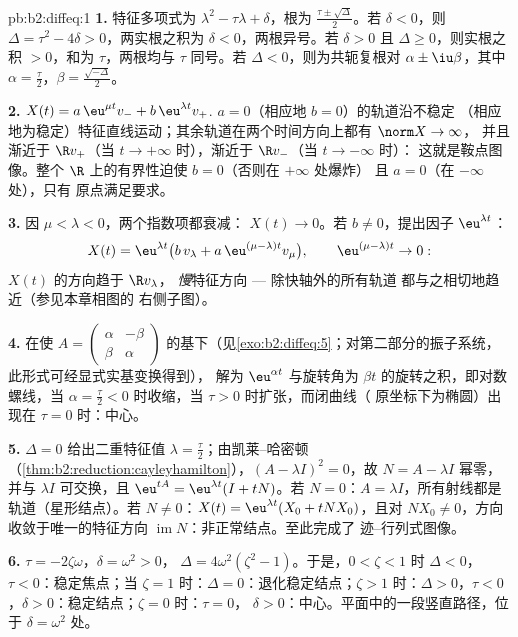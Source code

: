 \begin{solution}{pb:b2:diffeq:1}
\textbf{1.} 特征多项式为 $\lambda^2 -
\tau\lambda + \delta$，根为
$\frac{\tau\pm\sqrt\Delta}{2}$。若 $\delta < 0$，则 $\Delta =
\tau^2 - 4\delta > 0$，两实根之积为
$\delta < 0$，两根异号。若 $\delta > 0$ 且 $\Delta \geq
0$，则实根之积 $> 0$，和为 $\tau$，两根均与
$\tau$ 同号。若 $\Delta < 0$，则为共轭复根对 $\alpha \pm
\iu\beta$，其中 $\alpha = \frac\tau2$，$\beta =
\frac{\sqrt{-\Delta}}2$。

\textbf{2.} $X(t) = a\,\eu^{\mu t}v_- + b\,\eu^{\lambda t}v_+$.
$a = 0$（相应地 $b = 0$）的轨道沿不稳定
（相应地为稳定）特征直线运动；其余轨道在两个时间方向上都有 $\norm X \to \infty$，
并且渐近于 $\R v_+$（当 $t \to
+\infty$ 时），渐近于 $\R v_-$（当 $t \to -\infty$ 时）：
这就是鞍点图像。整个 $\R$ 上的有界性迫使 $b = 0$（否则在 $+\infty$ 处爆炸）
且 $a = 0$（在 $-\infty$ 处），只有
原点满足要求。

\textbf{3.} 因 $\mu < \lambda < 0$，两个指数项都衰减：
$X(t) \to 0$。若 $b \neq 0$，提出因子 $\eu^{\lambda t}$：
\[
X(t) = \eu^{\lambda t}\bigl(b\,v_\lambda + a\,\eu^{(\mu -
\lambda)t}v_\mu\bigr),
\qquad \eu^{(\mu-\lambda)t} \to 0 :
\]
$X(t)$ 的方向趋于 $\R v_\lambda$，
\emph{慢}特征方向 --- 除快轴外的所有轨道
都与之相切地趋近（参见本章相图的
右侧子图）。

\textbf{4.} 在使 $A = \begin{pmatrix} \alpha &
-\beta\\ \beta & \alpha\end{pmatrix}$
的基下（见\cref{exo:b2:diffeq:5}；对第二部分的振子系统，
此形式可经显式实基变换得到），
解为 $\eu^{\alpha t}$ 与旋转角为 $\beta
t$ 的旋转之积，即对数螺线，当 $\alpha = \frac\tau2
< 0$ 时收缩，当 $\tau > 0$ 时扩张，而闭曲线（
原坐标下为椭圆）出现在 $\tau = 0$ 时：中心。

\textbf{5.} $\Delta = 0$ 给出二重特征值 $\lambda =
\frac\tau2$；由凯莱–哈密顿
（\cref{thm:b2:reduction:cayleyhamilton}），$(A - \lambda I)^2 =
0$，故 $N = A - \lambda I$ 幂零，并与
$\lambda I$ 可交换，且 $\eu^{tA} = \eu^{\lambda t}(I + tN)$。若 $N =
0$：$A = \lambda I$，所有射线都是轨道（星形结点）。若 $N
\neq 0$：$X(t) = \eu^{\lambda t}(X_0 + tNX_0)$，且对 $NX_0
\neq 0$，方向收敛于唯一的特征方向
$\operatorname{im}N$：非正常结点。至此完成了
迹–行列式图像。

\textbf{6.} $\tau = -2\zeta\omega$，$\delta = \omega^2 > 0$，
$\Delta = 4\omega^2(\zeta^2 - 1)$。于是，$0 < \zeta < 1$ 时
$\Delta < 0$，$\tau < 0$：稳定焦点；当 $\zeta = 1$ 时：$\Delta =
0$：退化稳定结点；$\zeta > 1$ 时：$\Delta > 0$，$\tau <
0$，$\delta > 0$：稳定结点；$\zeta = 0$ 时：$\tau = 0$，
$\delta > 0$：中心。平面中的一段竖直路径，位于
$\delta = \omega^2$ 处。


\end{solution}
